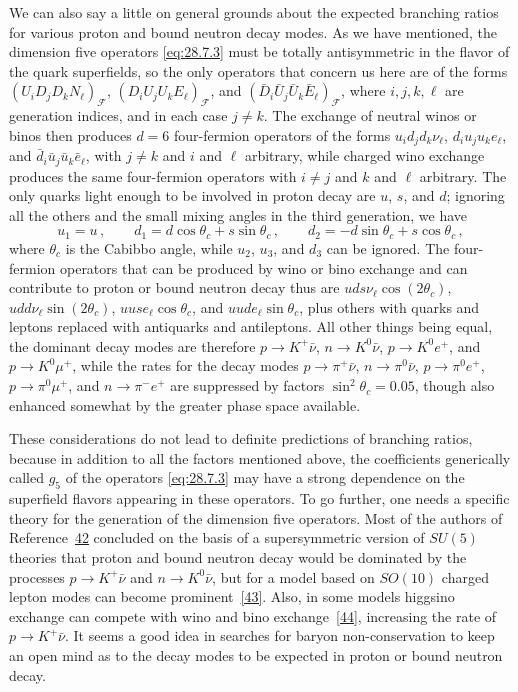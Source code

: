 We can also say a little on general grounds about the expected branching
ratios for various proton and bound neutron decay modes. As we have
mentioned, the dimension five operators \eqref{eq:28.7.3} must be totally
antisymmetric in the flavor of the quark superfields, so the only operators
that concern us here are of the forms
\((U_iD_jD_kN_\ell)_{\mathcal F}\),
\((D_iU_jU_kE_\ell)_{\mathcal F}\), and
\((\bar D_i\bar U_j\bar U_k\bar E_\ell)_{\mathcal F}\), where
\(i,j,k,\ell\) are generation indices, and in each case \(j\ne k\). The
exchange of neutral winos or binos then produces \(d=6\) four-fermion
operators of the forms \(u_id_jd_k\nu_\ell\), \(d_iu_ju_ke_\ell\), and
\(\bar d_i\bar u_j\bar u_k\bar e_\ell\), with \(j\ne k\) and \(i\) and
\(\ell\) arbitrary, while charged wino exchange produces the same
four-fermion operators with \(i\ne j\) and \(k\) and \(\ell\) arbitrary.
The only quarks light enough to be involved in proton decay are \(u\),
\(s\), and \(d\); ignoring all the others and the small mixing angles in
the third generation, we have
\[
  u_1=u\,,
  \qquad
  d_1=d\cos\theta_c+s\sin\theta_c\,,
  \qquad
  d_2=-d\sin\theta_c+s\cos\theta_c\,,
\]
where \(\theta_c\) is the Cabibbo angle, while \(u_2\), \(u_3\), and \(d_3\)
can be ignored. The four-fermion operators that can be produced by wino or
bino exchange and can contribute to proton or bound neutron decay thus are
\(uds\nu_\ell\cos(2\theta_c)\), \(udd\nu_\ell\sin(2\theta_c)\),
\(uuse_\ell\cos\theta_c\), and \(uude_\ell\sin\theta_c\), plus others with
quarks and leptons replaced with antiquarks and antileptons. All other
things being equal, the dominant decay modes are therefore
\(p\longrightarrow K^+\bar\nu\), \(n\longrightarrow K^0\bar\nu\),
\(p\longrightarrow K^0e^+\), and \(p\longrightarrow K^0\mu^+\), while the
rates for the decay modes \(p\longrightarrow\pi^+\bar\nu\),
\(n\longrightarrow\pi^0\bar\nu\), \(p\longrightarrow\pi^0e^+\),
\(p\longrightarrow\pi^0\mu^+\), and \(n\longrightarrow\pi^-e^+\) are
suppressed by factors \(\sin^2\theta_c=0.05\), though also enhanced
somewhat by the greater phase space available.

These considerations do not lead to definite predictions of branching
ratios, because in addition to all the factors mentioned above, the
coefficients generically called \(g_5\) of the operators
\eqref{eq:28.7.3} may have a strong dependence on the superfield flavors
appearing in these operators. To go further, one needs a specific theory
for the generation of the dimension five operators. Most of the authors of
Reference~\hyperref[ch28-ref-42]{42} concluded on the basis of a
supersymmetric version of \(SU(5)\) theories that proton and bound neutron
decay would be dominated by the processes \(p\longrightarrow K^+\bar\nu\)
and \(n\longrightarrow K^0\bar\nu\), but for a model based on \(SO(10)\)
charged lepton modes can become prominent~\hyperref[ch28-ref-43]{[43]}.
Also, in some models higgsino exchange can compete with wino and bino
exchange~\hyperref[ch28-ref-44]{[44]}, increasing the rate
of \(p\longrightarrow K^+\bar\nu\). It seems a good idea in searches for
baryon non-conservation to keep an open mind as to the decay modes to be
expected in proton or bound neutron decay.

